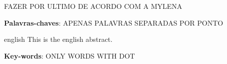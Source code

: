 
\setlength{\absparsep}{18pt} %
\begin{resumo}
FAZER POR ULTIMO DE ACORDO COM A MYLENA

 \textbf{Palavras-chaves}: APENAS PALAVRAS SEPARADAS POR PONTO
\end{resumo}

\begin{resumo}[Abstract]
 \begin{otherlanguage*}{english}
   This is the english abstract.
   \vspace{\onelineskip}
 
   \noindent 
   \textbf{Key-words}: ONLY WORDS WITH DOT
 \end{otherlanguage*}
\end{resumo}